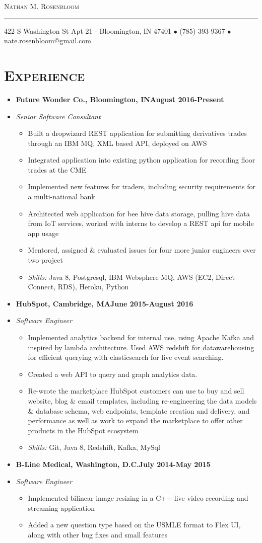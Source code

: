 \documentclass[10pt, oneside]{article}
\makeatletter
\newcommand{\lr}[2]{#1\hfill#2}
\newcommand{\name}{Nathan M. Rosenbloom}
\newcommand{\addr}{422 S Washington St Apt 21 - Bloomington, IN 47401}
\newcommand{\phone}{(785) 393-9367}
\newcommand{\email}{nate.rosenbloom@gmail.com}
\newcommand{\resname}[4]{
  \begin{center}
    \selectfont\LARGE\scshape #1
    \normalfont
    \footnotesize
    \itshape
    \rule{\textwidth}{1pt}
    #2 $\bullet$ #3 $\bullet$ #4
    \normalfont
  \end{center}
}
\newcommand{\skills}[1]{
\item[] \textsl{Skills:} #1
}
\newenvironment{ressection}[1]{
  \section{\normalsize \scshape \selectfont #1 \normalfont}
  \vspace{-4pt}
  \begin{itemize} \itemsep-2pt
  }{
  \end{itemize}
  \vspace{-20pt}
}
\newenvironment{resitem}[4]{
\item[] \lr{\bfseries \selectfont #1\normalfont, #2} {#3}
\item[] \textsl{#4}
  \vspace{-4pt}
  \begin{itemize} \itemsep-2pt
  }{
  \end{itemize}
}
\makeatother
\begin{document}
\resname{\name}{\addr}{\phone}{\email}
\setcounter{secnumdepth}{-1} %

\begin{ressection}{Experience}
  \begin{resitem}{Future Wonder Co.}{Bloomington, IN}{August 2016-Present}{Senior Software Consultant}
  \item Built a dropwizard REST application for submitting derivatives trades through an IBM MQ, XML based API, deployed on AWS
  \item Integrated application into existing python application for recording floor trades at the CME
  \item Implemented new features for traders, including security requirements for a multi-national bank
  \item Architected web application for bee hive data storage, pulling hive data from IoT services, worked with interns to develop a REST api for mobile app usage
  \item Mentored, assigned \& evaluated issues for four more junior engineers over two project 
    \skills{Java 8, Postgresql, IBM Websphere MQ, AWS (EC2, Direct Connect, RDS), Heroku, Python}
  \end{resitem}
  \begin{resitem}{HubSpot}{Cambridge, MA}{June 2015-August 2016}{Software Engineer}
  \item Implemented analytics backend for internal use, using Apache Kafka and inspired by lambda architecture. Used AWS redshift for datawarehousing for efficient querying with elasticsearch for live event searching.
  \item Created a web API to query and graph analytics data. 
  \item Re-wrote the marketplace HubSpot customers can use to buy and sell website, blog \& email templates, including re-engineering the data models \& database schema, web endpoints, template creation and delivery, and performance as well as work to expand the marketplace to offer other products in the HubSpot ecosystem
    \skills{Git, Java 8, Redshift, Kafka, MySql}
  \end{resitem}
  \begin {resitem}{B-Line Medical}{Washington, D.C.}{July 2014-May 2015}{Software Engineer} 
  \item Implemented bilinear image resizing in a C++ live video recording and streaming application
  \item Added a new question type based on the USMLE format to Flex UI, along with other bug fixes and small features

\end{resitem}
\end{ressection}
\end{document}
